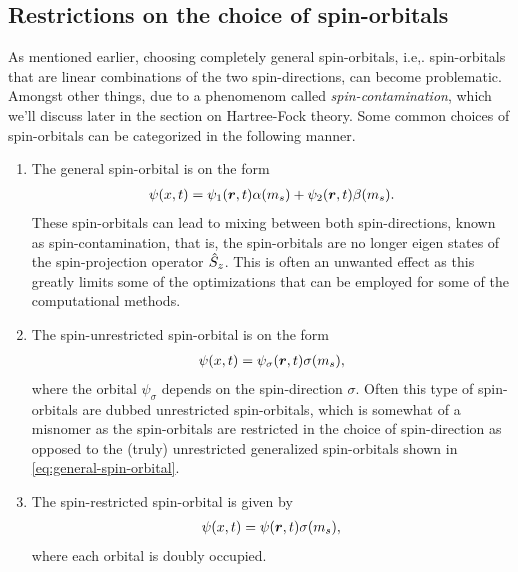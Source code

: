         \subsection{Restrictions on the choice of spin-orbitals}
            \label{subsec:restrictions-on-spin-orbitals}
            As mentioned earlier, choosing completely general spin-orbitals,
            i.e,. spin-orbitals that are linear combinations of the two
            spin-directions, can become problematic.
            Amongst other things, due to a phenomenom called
            \emph{spin-contamination}, which we'll discuss later in the section
            on Hartree-Fock theory.
            Some common choices of spin-orbitals can be categorized in the
            following manner.
            \begin{enumerate}
                \item The general spin-orbital is on the form
                    \begin{align}
                        \psi(x, t)
                        = \psi_1(\boldsymbol{r}, t) \alpha(m_s)
                        + \psi_2(\boldsymbol{r}, t) \beta(m_s).
                        \label{eq:general-spin-orbital}
                    \end{align}
                    These spin-orbitals can lead to mixing between both
                    spin-directions, known as spin-contamination, that is, the
                    spin-orbitals are no longer eigen states of the
                    spin-projection operator $\hat{S}_{z}$.
                    This is often an unwanted effect as this greatly limits some
                    of the optimizations that can be employed for some of the
                    computational methods.
                \item The spin-unrestricted spin-orbital is on the form
                    \begin{align}
                        \psi(x, t)
                        = \psi_{\sigma}(\boldsymbol{r}, t) \sigma(m_s),
                        \label{eq:unrestricted-spin-orbital}
                    \end{align}
                    where the orbital $\psi_{\sigma}$ depends on the
                    spin-direction $\sigma$.
                    Often this type of spin-orbitals are dubbed unrestricted
                    spin-orbitals, which is somewhat of a misnomer as the
                    spin-orbitals are restricted in the choice of spin-direction
                    as opposed to the (truly) unrestricted generalized
                    spin-orbitals shown in \autoref{eq:general-spin-orbital}.
                \item The spin-restricted spin-orbital is given by
                    \begin{align}
                        \psi(x, t)
                        = \psi(\boldsymbol{r}, t) \sigma(m_s),
                        \label{eq:restricted-spin-orbital}
                    \end{align}
                    where each orbital is doubly occupied.
            \end{enumerate}

